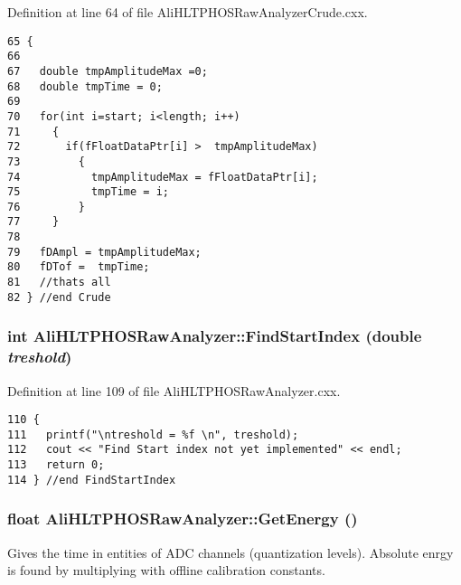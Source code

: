 Definition at line 64 of file Ali\-HLTPHOSRaw\-Analyzer\-Crude.cxx.

\footnotesize\begin{verbatim}65 {
66   
67   double tmpAmplitudeMax =0; 
68   double tmpTime = 0;
69 
70   for(int i=start; i<length; i++)
71     {
72       if(fFloatDataPtr[i] >  tmpAmplitudeMax)
73         {
74           tmpAmplitudeMax = fFloatDataPtr[i];
75           tmpTime = i;               
76         }
77     }
78         
79   fDAmpl = tmpAmplitudeMax;
80   fDTof =  tmpTime;
81   //thats all 
82 } //end Crude
\end{verbatim}\normalsize 


\subsubsection{\setlength{\rightskip}{0pt plus 5cm}int Ali\-HLTPHOSRaw\-Analyzer::Find\-Start\-Index (double {\em treshold})\hspace{0.3cm}{\tt  [inherited]}}\label{classAliHLTPHOSRawAnalyzer_AliHLTPHOSRawAnalyzerPeakFindera9}




Definition at line 109 of file Ali\-HLTPHOSRaw\-Analyzer.cxx.

\footnotesize\begin{verbatim}110 {
111   printf("\ntreshold = %f \n", treshold);
112   cout << "Find Start index not yet implemented" << endl;
113   return 0;
114 } //end FindStartIndex
\end{verbatim}\normalsize 


\subsubsection{\setlength{\rightskip}{0pt plus 5cm}float Ali\-HLTPHOSRaw\-Analyzer::Get\-Energy ()\hspace{0.3cm}{\tt  [inherited]}}\label{classAliHLTPHOSRawAnalyzer_AliHLTPHOSRawAnalyzerPeakFindera11}


Gives the time in entities of ADC channels (quantization levels). Absolute enrgy is found by multiplying with offline calibration constants. 


